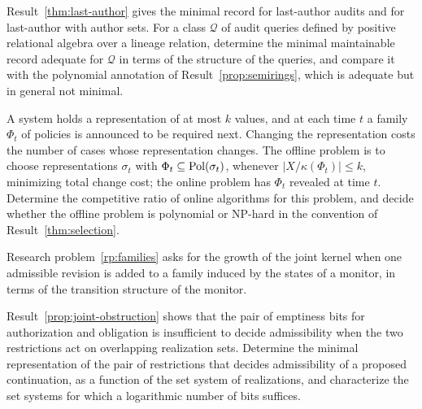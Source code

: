 \begin{researchproblem}\label{rp:provenance}
Result~\ref{thm:last-author} gives the minimal record for last-author audits and for last-author with author sets. For a class $\mathcal Q$ of audit queries defined by positive relational algebra over a lineage relation, determine the minimal maintainable record adequate for $\mathcal Q$ in terms of the structure of the queries, and compare it with the polynomial annotation of Result~\ref{prop:semirings}, which is adequate but in general not minimal.
\end{researchproblem}

\begin{researchproblem}\label{rp:allocation}
A system holds a representation of at most $k$ values, and at each time $t$ a family $\Phi_t$ of policies is announced to be required next. Changing the representation costs the number of cases whose representation changes. The offline problem is to choose representations $\sigma_t$ with $\Phi_t\subseteq\mathrm{Pol}(\sigma_t)$, whenever $|X/\kappa(\Phi_t)|\le k$, minimizing total change cost; the online problem has $\Phi_t$ revealed at time $t$. Determine the competitive ratio of online algorithms for this problem, and decide whether the offline problem is polynomial or NP-hard in the convention of Result~\ref{thm:selection}.
\end{researchproblem}

\begin{researchproblem}
Research problem~\ref{rp:families} asks for the growth of the joint kernel when one admissible revision is added to a family induced by the states of a monitor, in terms of the transition structure of the monitor.
\end{researchproblem}

\begin{researchproblem}
Result~\ref{prop:joint-obstruction} shows that the pair of emptiness bits for authorization and obligation is insufficient to decide admissibility when the two restrictions act on overlapping realization sets. Determine the minimal representation of the pair of restrictions that decides admissibility of a proposed continuation, as a function of the set system of realizations, and characterize the set systems for which a logarithmic number of bits suffices.
\end{researchproblem}

